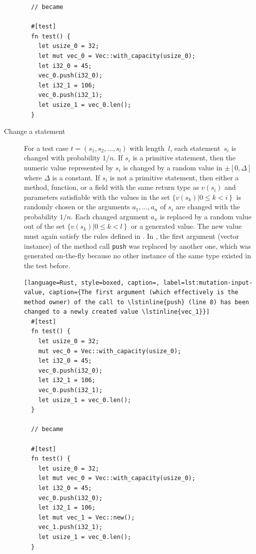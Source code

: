 \documentclass[paper=a4,%
  twoside,%
  BCOR4mm,%
  abstract=true,%
  toc=bibliography,%
  chapterprefix=true,%
  toc=bibliographynumbered,%
  open=right,%
  english,%
  pagesize=pdftex]{scrreprt}
\begin{document}
\begin{description}
\begin{lstlisting}
  // became

  #[test]
  fn test() {
    let usize_0 = 32;
    let mut vec_0 = Vec::with_capacity(usize_0);
    let i32_0 = 45;
    vec_0.push(i32_0);
    let i32_1 = 106;
    vec_0.push(i32_1);
    let usize_1 = vec_0.len();
  }
  \end{lstlisting}

  \item[Change a statement] For a test case $t = (s_1, s_2, \dots, s_l)$ with length~$l$, each statement~$s_i$ is changed with probability $1/n$. If $s_i$ is a primitive statement, then the numeric value represented by $s_i$ is changed by a random value in $\pm[0,\Delta]$ where $\Delta$ is a constant. If $s_i$ is not a primitive statement, then either a method, function, or a field with the same return type as $v(s_i)$ and parameters satisfiable with the values in the set $\{v(s_k) \left| 0 \leq k < i \right\}$ is randomly chosen or the arguments $a_1, \dots, a_n$ of $s_i$ are changed with the probability $1/n$. Each changed argument $a_x$ is replaced by a random value out of the set $\{v(s_k) \left| 0 \leq k < l \right\}$ or a generated value. The new value must again satisfy the rules defined in . In , the first argument (vector instance) of the method call \lstinline{push} was replaced by another one, which was generated on-the-fly because no other instance of the same type existed in the test before.

  \begin{lstlisting}[language=Rust, style=boxed, caption=, label=lst:mutation-input-value, caption={The first argument (which effectively is the method owner) of the call to \lstinline{push} (line 8) has been changed to a newly created value \lstinline{vec_1}}]
  #[test]
  fn test() {
    let usize_0 = 32;
    mut vec_0 = Vec::with_capacity(usize_0);
    let i32_0 = 45;
    vec_0.push(i32_0);
    let i32_1 = 106;
    vec_0.push(i32_1);
    let usize_1 = vec_0.len();
  }

  // became

  #[test]
  fn test() {
    let usize_0 = 32;
    let mut vec_0 = Vec::with_capacity(usize_0);
    let i32_0 = 45;
    vec_0.push(i32_0);
    let i32_1 = 106;
    let mut vec_1 = Vec::new();
    vec_1.push(i32_1);
    let usize_1 = vec_0.len();
  }
  \end{lstlisting}


\end{description}
\end{document}
